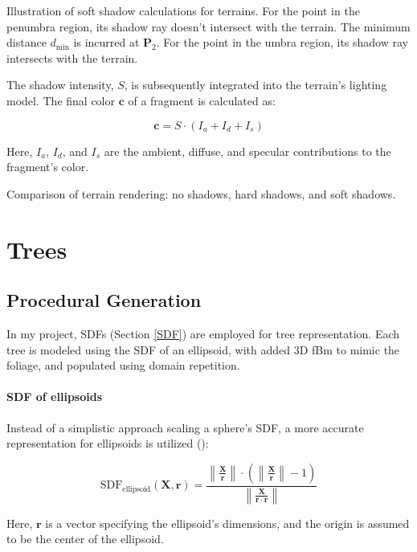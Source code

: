 {Illustration of soft shadow calculations for terrains. For the point in the penumbra region, its shadow ray doesn't intersect with the terrain. The minimum distance $d_{\text{min}}$ is incurred at $\mathbf{P}_2$. For the point in the umbra region, its shadow ray intersects with the terrain.}

The shadow intensity, $S$, is subsequently integrated into the terrain's lighting model. The final color $\mathbf{c}$ of a fragment is calculated as:

\begin{equation}
    \mathbf{c} = S \cdot (I_{a} + I_{d} + I_{s})
\end{equation}

Here, $I_{a}$, $I_{d}$, and $I_{s}$ are the ambient, diffuse, and specular contributions to the fragment's color.

{Comparison of terrain rendering: no shadows, hard shadows, and soft shadows.}

\section{Trees}

\subsection{Procedural Generation}
\label{Tree Procedural Generation}

In my project, SDFs (Section \ref{SDF}) are employed for tree representation. Each tree is modeled using the SDF of an ellipsoid, with added 3D fBm to mimic the foliage, and populated using domain repetition. 

\paragraph{SDF of ellipsoids}
Instead of a simplistic approach scaling a sphere's SDF, a more accurate representation for ellipsoids is utilized ():

\begin{equation}
\text{SDF}_\text{ellipsoid}(\mathbf{X}, \mathbf{r}) = \frac{\left\|\frac{\mathbf{X}}{\mathbf{r}}\right\| \cdot \left(\left\|\frac{\mathbf{X}}{\mathbf{r}}\right\| - 1\right)}{\left\|\frac{\mathbf{X}}{\mathbf{r} \cdot \mathbf{r}}\right\|}
\end{equation}

Here, $\mathbf{r}$ is a vector specifying the ellipsoid's dimensions, and the origin is assumed to be the center of the ellipsoid.

